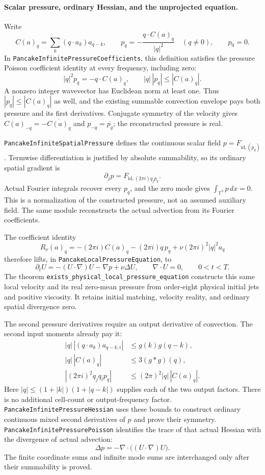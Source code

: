 \documentclass[11pt]{article}
\theoremstyle{definition}
\begin{document}
\paragraph{Scalar pressure, ordinary Hessian, and the unprojected equation.}
Write
\[
 C(a)_q=\sum_k(q\cdot a_k)a_{q-k},\qquad
 p_q=-\frac{q\cdot C(a)_q}{|q|^2}\quad(q\ne0),\qquad p_0=0.
\]
In \texttt{PancakeInfinitePressureCoefficients}, this definition satisfies
the pressure Poisson coefficient identity at every frequency, including
zero:
\[
 |q|^2p_q=-q\cdot C(a)_q,\qquad
 |q|\,|p_q|\le |C(a)_q|.
\]
A nonzero integer wavevector has Euclidean norm at least one. Thus
$|p_q|\le |C(a)_q|$ as well, and the existing summable convection envelope
pays both pressure and its first derivatives. Conjugate symmetry of the
velocity gives $C(a)_{-q}=-\overline{C(a)_q}$ and
$p_{-q}=\overline{p_q}$; the reconstructed pressure is real.

\texttt{PancakeInfiniteSpatialPressure} defines the continuous scalar field
$p=F_{\mathrm{id},(p_q)}$. Termwise differentiation is justified by absolute
summability, so its ordinary spatial gradient is
\[
 \partial_jp=F_{\mathrm{id},(2\pi i)q_jp_q}.
\]
Actual Fourier integrals recover every $p_q$, and the zero mode gives
$\int_{\mathbb T^3}p\,dx=0$. This is a normalization of the constructed
pressure, not an assumed auxiliary field. The same module reconstructs
the actual advection from its Fourier coefficients.

The coefficient identity
\[
 R_\nu(a)_q=-(2\pi i)C(a)_q-(2\pi i)q\,p_q
             +\nu(2\pi i)^2|q|^2a_q
\]
therefore lifts, in \texttt{PancakeLocalPressureEquation}, to
\[
 \boxed{\quad
 \partial_t U=-(U\cdot\nabla)U-\nabla p+\nu\Delta U,\qquad
 \nabla\cdot U=0,\qquad 0<t<T.
 \quad}
\]
The theorem \texttt{exists\_physical\_local\_pressure\_equation} constructs
this same local velocity and its real zero-mean pressure from order-eight
physical initial jets and positive viscosity. It retains initial matching,
velocity reality, and ordinary spatial divergence zero.

The second pressure derivatives require an output derivative of convection.
The second input moments already pay it:
\[
 \begin{split}
 |q|\,|(q\cdot a_k)a_{q-k,i}|&\le g(k)g(q-k),\\
 |q|\,|C(a)_q|&\le 3(g*g)(q),\\
 |(2\pi i)^2q_jq_l p_q|&\le (2\pi)^2|q|\,|C(a)_q|.
 \end{split}
\]
Here $|q|\le(1+|k|)(1+|q-k|)$ supplies each of the two output factors.
There is no additional cell-count or output-frequency factor.
\texttt{PancakeInfinitePressureHessian} uses these bounds to construct
ordinary continuous mixed second derivatives of $p$ and prove their
symmetry. \texttt{PancakeInfinitePressurePoisson} identifies the trace of
that actual Hessian with the divergence of actual advection:
\[
 \Delta p=-\nabla\cdot\bigl((U\cdot\nabla)U\bigr).
\]
The finite coordinate sums and infinite mode sums are interchanged only
after their summability is proved.
\end{document}
